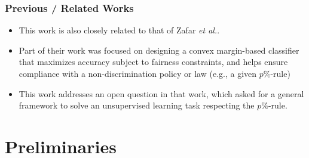 \documentclass{beamer}
\begin{document}
\begin{frame}
\frametitle{Previous / Related Works}

\begin{itemize}
    \item This work is also closely related to that of Zafar {\it et al.}. \pause
    
    \item Part of their work was focused on designing a convex margin-based classifier that maximizes accuracy subject to fairness constraints, and helps ensure compliance with a non-discrimination policy or law (e.g., a given $p\%$-rule) \pause
        
    \item This work addresses an open question in that work, which asked for a general framework to solve an unsupervised learning task respecting the $p\%$-rule.
\end{itemize}
\end{frame}



\section{Preliminaries}
\end{document}
